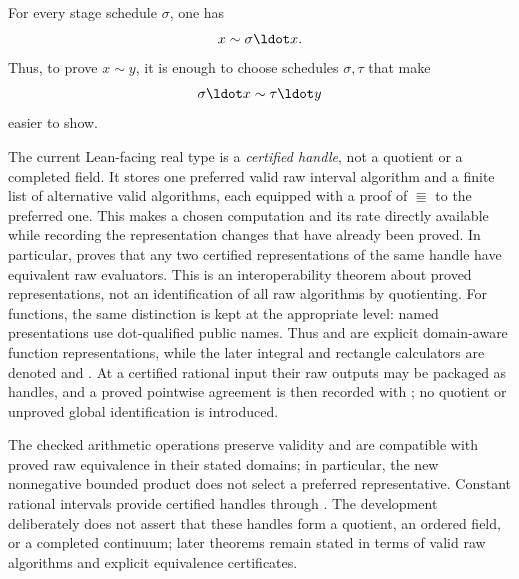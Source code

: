 \begin{proposition}\label{prop:stage-schedule-equiv}
For every stage schedule \(\sigma\), one has
\[
  x\sim \sigma\ldot x.
\]
Thus, to prove \(x\sim y\), it is enough to choose schedules
\(\sigma,\tau\) that make
\[
  \sigma\ldot x\sim \tau\ldot y
\]
easier to show.
\end{proposition}

\begin{definition}\label{def:reals-quotient}
The current Lean-facing real type is a \emph{certified handle}, not a quotient
or a completed field.  It stores one preferred valid raw interval algorithm
and a finite list of alternative valid algorithms, each equipped with a proof
of \(\Equiv\) to the preferred one.  This makes a chosen computation and its
rate directly available while recording the representation changes that have
already been proved.
In particular,  proves that any two certified
representations of the same handle have equivalent raw evaluators.  This is an
interoperability theorem about proved representations, not an identification
of all raw algorithms by quotienting.
For functions, the same distinction is kept at the appropriate level: named
presentations use dot-qualified public names.  Thus  and
 are explicit domain-aware function representations, while
the later integral and rectangle calculators are denoted
 and .  At a certified rational
input their raw outputs may be packaged as  handles, and a proved
pointwise agreement is then recorded with ; no
quotient or unproved global identification is introduced.
\end{definition}

\begin{proposition}\label{thm:raw-reals-field}
The checked arithmetic operations preserve validity and are compatible with
proved raw equivalence in their stated domains; in particular, the new
nonnegative bounded product does not select a preferred representative.
Constant rational intervals provide certified handles through
.  The development deliberately does not assert that these
handles form a quotient, an ordered field, or a completed continuum; later
theorems remain stated in terms of valid raw algorithms and explicit
equivalence certificates.
\end{proposition}

